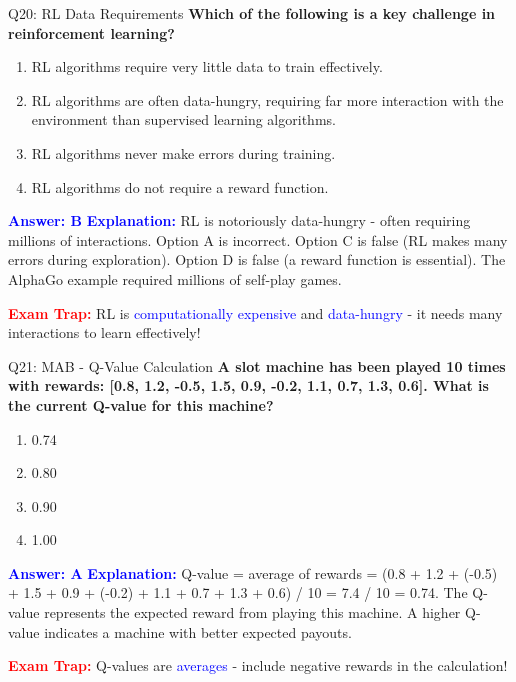 \documentclass[8pt]{beamer}
\begin{document}
	\begin{frame}{Q20: RL Data Requirements}
		\fontsize{6.5}{7.5}\selectfont
		\textbf{Which of the following is a key challenge in reinforcement learning?}
		
		\begin{enumerate}
			\item RL algorithms require very little data to train effectively.
			\item RL algorithms are often data-hungry, requiring far more interaction with the environment than supervised learning algorithms.
			\item RL algorithms never make errors during training.
			\item RL algorithms do not require a reward function.
		\end{enumerate}
		
		\vspace{0.1cm}
		\textcolor{blue}{\textbf{Answer: B}}
		\vspace{0.1cm}
		\textcolor{blue}{\textbf{Explanation:}} RL is notoriously data-hungry - often requiring millions of interactions. Option A is incorrect. Option C is false (RL makes many errors during exploration). Option D is false (a reward function is essential). The AlphaGo example required millions of self-play games.
		
		\textcolor{red}{\textbf{Exam Trap:}} RL is \textcolor{blue}{computationally expensive} and \textcolor{blue}{data-hungry} - it needs many interactions to learn effectively!
	\end{frame}
	
	
	\begin{frame}{Q21: MAB - Q-Value Calculation}
		\fontsize{6.5}{7.5}\selectfont
		\textbf{A slot machine has been played 10 times with rewards: [0.8, 1.2, -0.5, 1.5, 0.9, -0.2, 1.1, 0.7, 1.3, 0.6]. What is the current Q-value for this machine?}
		
		\begin{enumerate}
			\item 0.74
			\item 0.80
			\item 0.90
			\item 1.00
		\end{enumerate}
		
		\vspace{0.1cm}
		\textcolor{blue}{\textbf{Answer: A}}
		\vspace{0.1cm}
		\textcolor{blue}{\textbf{Explanation:}} Q-value = average of rewards = (0.8 + 1.2 + (-0.5) + 1.5 + 0.9 + (-0.2) + 1.1 + 0.7 + 1.3 + 0.6) / 10 = 7.4 / 10 = 0.74. The Q-value represents the expected reward from playing this machine. A higher Q-value indicates a machine with better expected payouts.
		
		\textcolor{red}{\textbf{Exam Trap:}} Q-values are \textcolor{blue}{averages} - include negative rewards in the calculation!
	\end{frame}
	
\end{document}
